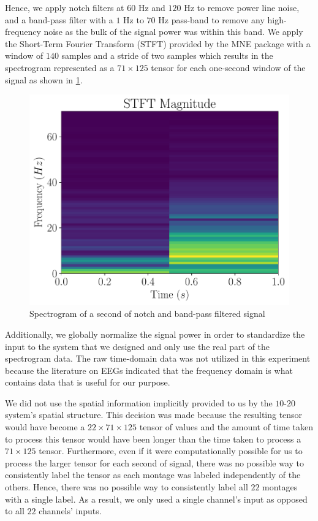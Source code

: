 Hence, we apply notch filters at $60$ Hz and $120$ Hz to remove power line noise, and a band-pass filter with a $1$ Hz to $70$ Hz pass-band to remove any high-frequency noise as the bulk of the signal power was within this band. We apply the Short-Term Fourier Transform (STFT) provided by the MNE package with a window of $140$ samples and a stride of two samples which results in the spectrogram represented as a $71 \times 125$ tensor for each one-second window of the signal as shown in \cref{fig:stft}. 

\begin{figure}[!ht]
	\centering
	\includegraphics[width=0.65\linewidth]{pictures/plot21.pdf}
	\caption[Example spectrogram of EEG]{Spectrogram of a second of notch and band-pass filtered signal}\label{fig:stft}  
\end{figure}

Additionally, we globally normalize the signal power in order to standardize the input to the system that we designed and only use the real part of the spectrogram data. The raw time-domain data was not utilized in this experiment because the literature \cite{eegs_info, eeg_info2, mayo_eegs} on EEGs indicated that the frequency domain is what contains data that is useful for our purpose.

We did not use the spatial information implicitly provided to us by the $10$-$20$ system's spatial structure. This decision was made because the resulting tensor would have become a $22 \times 71 \times 125$ tensor of values and the amount of time taken to process this tensor would have been longer than the time taken to process a $71 \times 125$ tensor. Furthermore, even if it were computationally possible for us to process the larger tensor for each second of signal, there was no possible way to consistently label the tensor as each montage was labeled independently of the others. Hence, there was no possible way to consistently label all $22$ montages with a single label. As a result, we only used a single channel's input as opposed to all $22$ channels' inputs. 

